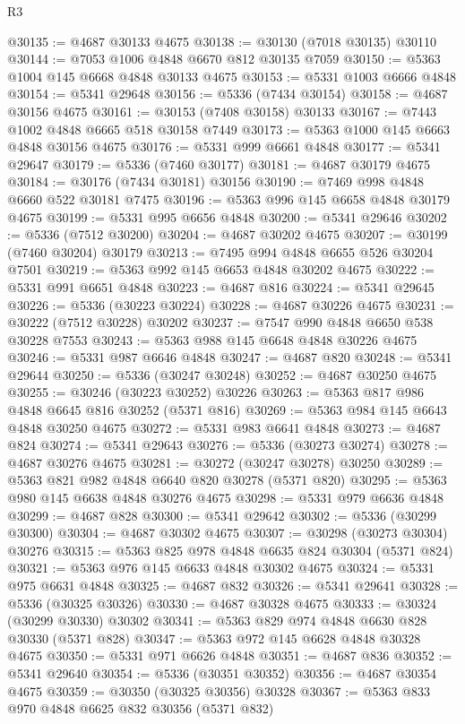 \begin{lexlean}{R3}
\begin{coremodule}
@30135 := @4687 @30133 @4675
@30138 := @30130 (@7018 @30135) @30110
@30144 := @7053 @1006 @4848 @6670 @812 @30135 @7059
@30150 := @5363 @1004 @145 @6668 @4848 @30133 @4675
@30153 := @5331 @1003 @6666 @4848
@30154 := @5341 @29648
@30156 := @5336 (@7434 @30154)
@30158 := @4687 @30156 @4675
@30161 := @30153 (@7408 @30158) @30133
@30167 := @7443 @1002 @4848 @6665 @518 @30158 @7449
@30173 := @5363 @1000 @145 @6663 @4848 @30156 @4675
@30176 := @5331 @999 @6661 @4848
@30177 := @5341 @29647
@30179 := @5336 (@7460 @30177)
@30181 := @4687 @30179 @4675
@30184 := @30176 (@7434 @30181) @30156
@30190 := @7469 @998 @4848 @6660 @522 @30181 @7475
@30196 := @5363 @996 @145 @6658 @4848 @30179 @4675
@30199 := @5331 @995 @6656 @4848
@30200 := @5341 @29646
@30202 := @5336 (@7512 @30200)
@30204 := @4687 @30202 @4675
@30207 := @30199 (@7460 @30204) @30179
@30213 := @7495 @994 @4848 @6655 @526 @30204 @7501
@30219 := @5363 @992 @145 @6653 @4848 @30202 @4675
@30222 := @5331 @991 @6651 @4848
@30223 := @4687 @816
@30224 := @5341 @29645
@30226 := @5336 (@30223 @30224)
@30228 := @4687 @30226 @4675
@30231 := @30222 (@7512 @30228) @30202
@30237 := @7547 @990 @4848 @6650 @538 @30228 @7553
@30243 := @5363 @988 @145 @6648 @4848 @30226 @4675
@30246 := @5331 @987 @6646 @4848
@30247 := @4687 @820
@30248 := @5341 @29644
@30250 := @5336 (@30247 @30248)
@30252 := @4687 @30250 @4675
@30255 := @30246 (@30223 @30252) @30226
@30263 := @5363 @817 @986 @4848 @6645 @816 @30252 (@5371 @816)
@30269 := @5363 @984 @145 @6643 @4848 @30250 @4675
@30272 := @5331 @983 @6641 @4848
@30273 := @4687 @824
@30274 := @5341 @29643
@30276 := @5336 (@30273 @30274)
@30278 := @4687 @30276 @4675
@30281 := @30272 (@30247 @30278) @30250
@30289 := @5363 @821 @982 @4848 @6640 @820 @30278 (@5371 @820)
@30295 := @5363 @980 @145 @6638 @4848 @30276 @4675
@30298 := @5331 @979 @6636 @4848
@30299 := @4687 @828
@30300 := @5341 @29642
@30302 := @5336 (@30299 @30300)
@30304 := @4687 @30302 @4675
@30307 := @30298 (@30273 @30304) @30276
@30315 := @5363 @825 @978 @4848 @6635 @824 @30304 (@5371 @824)
@30321 := @5363 @976 @145 @6633 @4848 @30302 @4675
@30324 := @5331 @975 @6631 @4848
@30325 := @4687 @832
@30326 := @5341 @29641
@30328 := @5336 (@30325 @30326)
@30330 := @4687 @30328 @4675
@30333 := @30324 (@30299 @30330) @30302
@30341 := @5363 @829 @974 @4848 @6630 @828 @30330 (@5371 @828)
@30347 := @5363 @972 @145 @6628 @4848 @30328 @4675
@30350 := @5331 @971 @6626 @4848
@30351 := @4687 @836
@30352 := @5341 @29640
@30354 := @5336 (@30351 @30352)
@30356 := @4687 @30354 @4675
@30359 := @30350 (@30325 @30356) @30328
@30367 := @5363 @833 @970 @4848 @6625 @832 @30356 (@5371 @832)

\end{coremodule}
\end{lexlean}
